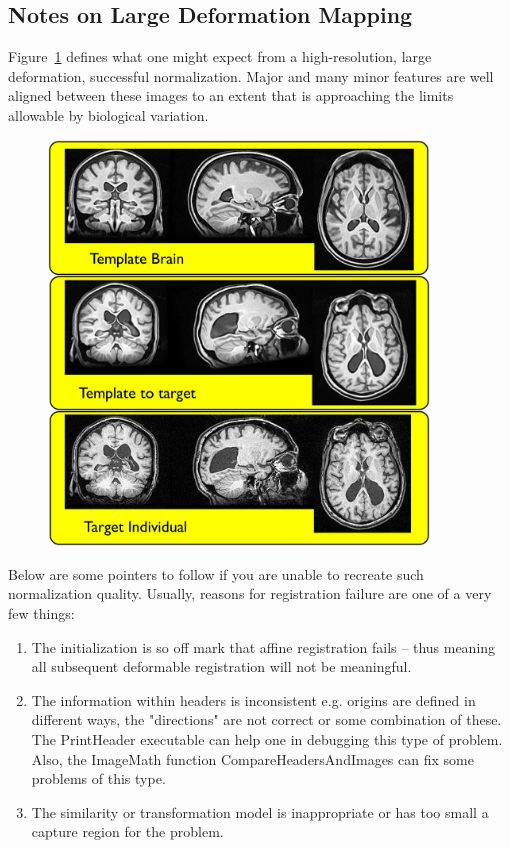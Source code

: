 \documentclass{InsightArticle}
\begin{document}
\subsection{Notes on Large Deformation Mapping} 
Figure~\ref{fig:large} defines what one might expect from a 
high-resolution, large deformation, successful normalization.  
Major and many minor features are well aligned between 
these images to an extent that is approaching the limits 
allowable by biological variation.  
\begin{figure}
\label{fig:large}
\includegraphics[width=0.9\textwidth]{Figures/ANTSLargeDef.jpg} 
\end{figure}
Below are some pointers to follow if you are unable to recreate such normalization quality.  
Usually, reasons for registration failure are one of a very few things: 
\begin{enumerate}
\item The initialization is so off mark that affine registration fails -- thus meaning all subsequent deformable registration will not be meaningful.
\item The information within headers is inconsistent e.g. origins are defined in different ways, the "directions" are not correct or some combination of these.    The PrintHeader executable can help one in debugging this type of problem.  Also, the ImageMath function CompareHeadersAndImages can fix some problems of this type. 
\item  The similarity or transformation model is inappropriate or has too small a capture region for the problem. 
\end{enumerate}
\end{document}

